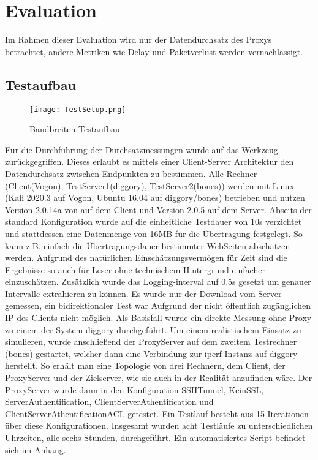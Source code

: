 \documentclass[12pt, a4paper]{scrartcl}
\begin{document}
\section{Evaluation}
Im Rahmen dieser Evaluation wird nur der Datendurchsatz des Proxys betrachtet, andere Metriken wie Delay und Paketverlust werden vernachlässigt.
\subsection{Testaufbau}
\begin{figure}
    \centering
    \texttt{[image: TestSetup.png]}
    \caption{Bandbreiten Testaufbau}
    \label{fig::test}
\end{figure}
Für die Durchführung der Durchsatzmessungen wurde auf das Werkzeug  zurückgegriffen. Dieses erlaubt es mittels einer Client-Server Architektur den Datendurchsatz zwischen Endpunkten zu bestimmen.\newline
Alle Rechner (Client(Vogon), TestServer1(diggory), TestServer2(bones)) werden mit Linux (Kali 2020.3 auf Vogon, Ubuntu 16.04 auf diggory/bones) betrieben und nutzen Version 2.0.14a von  auf dem Client und Version 2.0.5 auf dem Server. Abseits der standard Konfiguration wurde auf die einheitliche Testdauer von 10s verzichtet und stattdessen eine Datenmenge von 16MB für die Übertragung festgelegt. So kann z.B. einfach die Übertragungsdauer bestimmter WebSeiten abschätzen werden. Aufgrund des natürlichen Einschätzungsvermögen für Zeit sind die Ergebnisse so auch für Leser ohne technischem Hintergrund einfacher einzuschätzen. Zusätzlich wurde das Logging-interval auf 0.5s gesetzt um genauer Intervalle extrahieren zu können. Es wurde nur der Download vom Server gemessen, ein bidirektionaler Test war Aufgrund der nicht öffentlich zugänglichen IP des Clients nicht möglich.\newline
Als Basisfall wurde ein direkte Messung ohne Proxy zu einem der System diggory durchgeführt. Um einem realistischem Einsatz zu simulieren, wurde anschließend der ProxyServer auf dem zweitem Testrechner (bones) gestartet, welcher dann eine Verbindung zur iperf Instanz auf diggory herstellt. So erhält man eine Topologie von drei Rechnern, dem Client, der ProxyServer und der Zielserver, wie sie auch in der Realität anzufinden wäre.\newline
Der ProxyServer wurde dann in den Konfiguration SSHTunnel, KeinSSL, ServerAuthentification, ClientServerAthentification und ClientServerAthentificationACL getestet. Ein Testlauf besteht aus 15 Iterationen über diese Konfigurationen. Insgesamt wurden acht Testläufe zu unterschiedlichen Uhrzeiten, alle sechs Stunden, durchgeführt. Ein automatisiertes Script befindet sich im Anhang.
\end{document}
